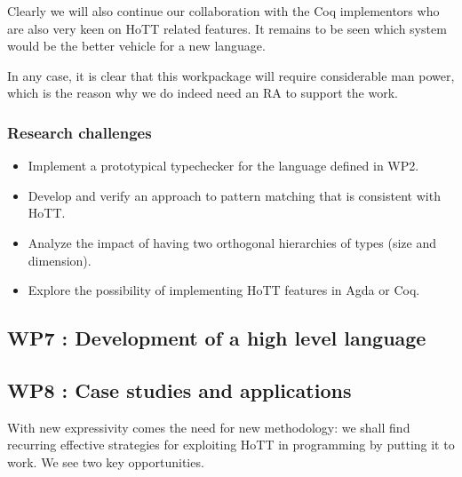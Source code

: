 \documentclass[twocolumn,a4paper,11pt]{article}
\begin{document}
Clearly we will also continue our collaboration with the Coq
implementors who are also very keen on HoTT related features. It
remains to be seen which system would be the better vehicle for a new
language.

In any case, it is clear that this workpackage will require
considerable man power, which is the reason why we do indeed need an
RA to support the work. 


\subsubsection*{Research challenges}

\begin{itemize}

\item Implement a prototypical typechecker for the language defined in
  WP2. 

\item Develop and verify an approach to pattern matching that is
  consistent with HoTT.

\item Analyze the impact of having two orthogonal hierarchies of types
  (size and dimension).

\item Explore the possibility of implementing HoTT features in Agda or
  Coq.
  
\end{itemize}

\subsection*{WP7 : Development of a high level language} 

\subsection*{WP8 : Case studies and applications} 

With new expressivity comes the need for new
methodology: we shall find recurring effective strategies for
exploiting HoTT in programming by putting it to work. We see two
key opportunities.
\end{document}
